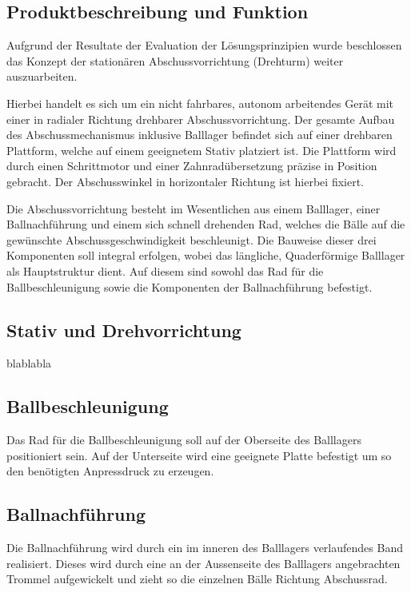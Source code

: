 \subsection{Produktbeschreibung und Funktion}

Aufgrund der Resultate der Evaluation der Lösungsprinzipien wurde beschlossen 
das Konzept der stationären Abschussvorrichtung (Drehturm) weiter 
auszuarbeiten. 

Hierbei handelt es sich um ein nicht fahrbares, autonom arbeitendes Gerät mit 
einer in radialer Richtung drehbarer Abschussvorrichtung. Der gesamte Aufbau 
des Abschussmechanismus inklusive Balllager befindet sich auf einer drehbaren 
Plattform, welche auf einem geeignetem Stativ platziert ist. Die Plattform 
wird durch einen Schrittmotor und einer Zahnradübersetzung präzise in Position 
gebracht. Der Abschusswinkel in horizontaler Richtung ist hierbei fixiert. 

Die Abschussvorrichtung besteht im Wesentlichen aus einem Balllager, einer 
Ballnachführung und einem sich schnell drehenden Rad, welches die Bälle auf 
die gewünschte Abschussgeschwindigkeit beschleunigt. Die Bauweise dieser drei 
Komponenten soll integral erfolgen, wobei das längliche, Quaderförmige 
Balllager als Hauptstruktur dient. Auf diesem sind sowohl das Rad für die 
Ballbeschleunigung sowie die Komponenten der Ballnachführung befestigt.

\subsection{Stativ und Drehvorrichtung}
blablabla

\subsection{Ballbeschleunigung}
Das Rad für die Ballbeschleunigung soll auf der Oberseite des Balllagers 
positioniert sein. Auf der Unterseite wird eine geeignete Platte befestigt um 
so den benötigten Anpressdruck zu erzeugen. 

\subsection{Ballnachführung}
Die Ballnachführung wird durch ein im inneren des Balllagers verlaufendes Band 
realisiert. Dieses wird durch eine an der Aussenseite des Balllagers 
angebrachten Trommel aufgewickelt und zieht so die einzelnen Bälle Richtung 
Abschussrad.


